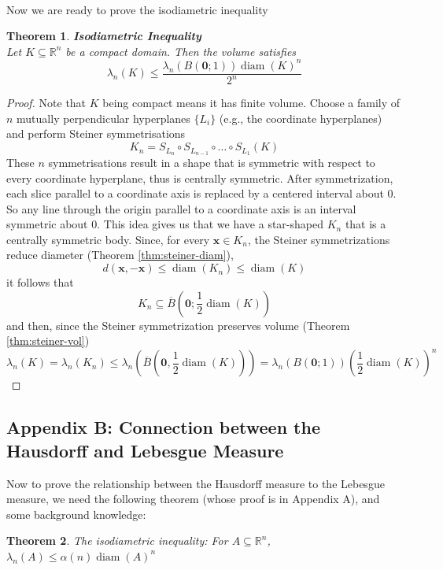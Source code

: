 \documentclass{article}
\theoremstyle{plain}
\newtheorem{thm}{Theorem}[section]
\theoremstyle{definition}
\DeclareMathOperator{\diam}{diam}
\theoremstyle{remark}
\begin{document}
\newpage

~\\Now we are ready to prove the isodiametric inequality

\begin{thm}{\textbf{Isodiametric Inequality}} ~\\
    Let $K \subseteq \mathbb{R}^n$ be a compact domain. Then the volume satisfies 
    \[
    \lambda_n(K) \le \frac{\lambda_n(B(\mathbf{0}; 1)) \diam (K )^n}{2^n}
    \]

\end{thm}

\begin{proof}
    Note that $K$ being compact means it has finite volume. Choose a family of $n$ mutually perpendicular hyperplanes $\{L_i\}$ (e.g., the coordinate hyperplanes) and perform Steiner symmetrisations
    \[
    K_n = S_{L_n} \circ S_{L_{n-1}} \circ \dots \circ S_{L_1}(K)
    \]
    These $n$ symmetrisations result in a shape that is symmetric with respect to every coordinate hyperplane, thus is centrally symmetric. After symmetrization, each slice parallel to a coordinate axis is replaced by a centered interval about 0. So any line through the origin parallel to a coordinate axis is an interval symmetric about 0. This idea gives us that we have a star-shaped $K_n$ that is a centrally symmetric body. Since, for every $\mathbf{x} \in K_n$, the Steiner symmetrizations reduce diameter (Theorem \ref{thm:steiner-diam}), \[d(\mathbf{x}, -\mathbf{x}) \le \diam (K_n) \le \diam (K)\]it follows that 
    \[K_n \subseteq \overline{B} \left (\mathbf{0}; \frac{1}{2} \diam (K ) \right )\]
    and then, since the Steiner symmetrization preserves volume (Theorem \ref{thm:steiner-vol}) \[
    \lambda _n (K) = \lambda _n(K_n) \le \lambda _n \left ( \overline{B} \left (\mathbf{0}, \frac{1}{2} \diam (K) \right) \right ) = \lambda _n(B(\mathbf{0}; 1)) \left ( \frac{1}{2} \diam (K) \right)^n
    \]
\end{proof}

\newpage


\subsection{Appendix B: Connection between the Hausdorff and Lebesgue Measure}
Now to prove the relationship between the Hausdorff measure to the Lebesgue measure, we need the following theorem (whose proof is in Appendix A), and some background knowledge:

\begin{thm} \label{thm:isodiametric}
    The isodiametric inequality: For $A \subseteq \mathbb{R}^n$, $\lambda_n(A) \le \alpha (n) \diam (A)^n$
\end{thm}
\end{document}
